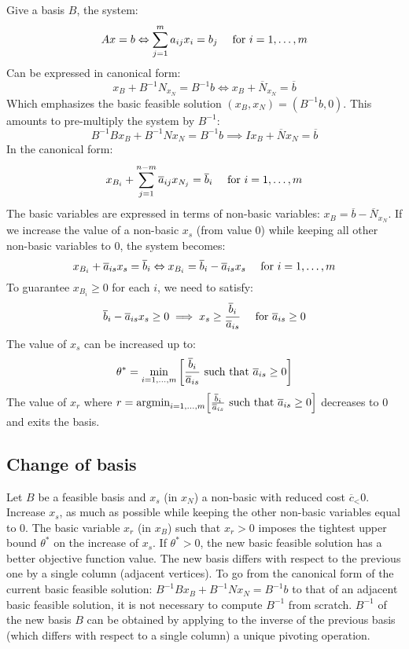 Give a basis $B$, the system: 
\[Ax=b \Leftrightarrow \sum_{j=1}^{m}a_{ij}x_i=b_j \:\:\:\:\:\: \textnormal{for }i=1,\dots,m\]
Can be expressed in canonical form: 
\[x_B+B^{-1}N_{x_N}=B^{-1}b \Leftrightarrow x_B+\overline{N}_{x_N}=\overline{b}\]
Which emphasizes the basic feasible solution $(x_B,x_N)=(B^{-1}b,0)$. 
This amounts to pre-multiply the system by $B^{-1}$: 
\[B^{-1}Bx_B+B^{-1}Nx_N=B^{-1}b \implies Ix_B+\overline{N}x_N=\overline{b}\]
In the canonical form: 
\[x_{B_i}+\sum_{j=1}^{n-m}\overline{a}_{ij}x_{N_j}=\overline{b}_i \:\:\:\:\:\: \textnormal{for }i=1,\dots,m\]
The basic variables are expressed in terms of non-basic variables: $x_B=\overline{b}-\overline{N}_{x_N}$. 
If we increase the value of a non-basic $x_s$ (from value 0) while keeping all other non-basic variables to 0, the system becomes: 
\[x_{B_i}+\overline{a}_{is}x_s=\overline{b}_i \Leftrightarrow x_{B_i}=\overline{b}_i-\overline{a}_{is}x_s \:\:\:\:\:\: \textnormal{for }i=1,\dots,m\]
To guarantee $x_{B_i} \geq 0$ for each $i$, we need to satisfy: 
\[\overline{b}_i-\overline{a}_{is}x_s \geq 0 \implies x_s \geq \dfrac{\overline{b}_i}{\overline{a}_{is}} \:\:\:\:\:\: \textnormal{for }\overline{a}_{is} \geq 0\]
The value of $x_s$ can be increased up to: 
\[\theta^{*}=\min_{i=1,\dots,m}{\left[\dfrac{\overline{b}_i}{\overline{a}_{is}} \textnormal{ such that }\overline{a}_{is} \geq 0\right]}\]
The value of $x_r$ where $r=\textnormal{argmin}_{i=1,\dots,m}{\left[\frac{\overline{b}_i}{\overline{a}_{is}} \textnormal{ such that }\overline{a}_{is} \geq 0\right]}$ decreases to 0 and exits the basis. 

\subsection*{Change of basis}
Let $B$ be a feasible basis and $x_s$ (in $x_N$) a non-basic with reduced cost $\overline{c}_ < 0$.
Increase $x_s$, as much as possible  while keeping the other non-basic variables equal to 0.
The basic variable $x_r$ (in $x_B$) such that $x_r>0$ imposes the tightest upper bound $\theta^{*}$ on the increase of $x_s$.
If $\theta^{*} > 0$, the new basic feasible solution has a better objective function value.
The new basis differs with respect to the previous one by a single column (adjacent vertices).
To go from the canonical form of the current basic feasible solution:
$B^{-1}Bx_B+B^{-1}Nx_N=B^{-1}b$
to that of an adjacent basic feasible solution, it is not necessary to compute $B^{-1}$ from scratch.
$B^{-1}$ of the new basis $B$ can be obtained by applying to the inverse of the previous basis (which differs with respect to a single column) a unique pivoting operation.


